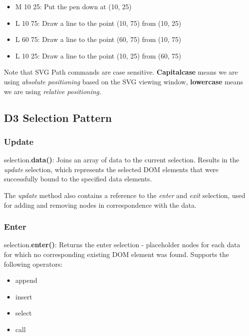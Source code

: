 \documentclass[red]{beamer}
\begin{document}
\begin{frame}
  \lstsvgtriangle
\end{frame}

\begin{frame}
  \begin{itemize}
  \item<1->M 10 25: Put the pen down at (10, 25)
  \item<2->L 10 75: Draw a line to the point (10, 75) from (10, 25)
  \item<3->L 60 75: Draw a line to the point (60, 75) from (10, 75)
  \item<4->L 10 25: Draw a line to the point (10, 25) from (60, 75)
  \end{itemize}

  Note that SVG Path commands are case sensitive. \textbf{Capitalcase} means we are using \textit{absolute positioning} based on the
  SVG viewing window, \textbf{lowercase} means we are using \textit{relative positioning}. 
\end{frame}

\subsection{D3 Selection Pattern}
\begin{frame}
  \frametitle{Update}
  selection.\textbf{data()}: Joins an array of data to the current selection. Results in the \textit{update} selection, which represents the selected DOM elements that were successfully bound to the specified data elements.
  \newline

  The \textit{update} method also contains a reference to the \textit{enter} and \textit{exit} selection, used for adding and removing nodes in correspondence with the data.
\end{frame}

\begin{frame}
  \frametitle{Enter}
  selection.\textbf{enter()}: Returns the enter selection - placeholder nodes for each data for which no corresponding existing DOM element was found. Supports the following operators:
  \begin{itemize}
  \item<1->append
  \item<2->insert
  \item<3->select
  \item<4->call
  \end{itemize}

\end{frame}
\end{document}
